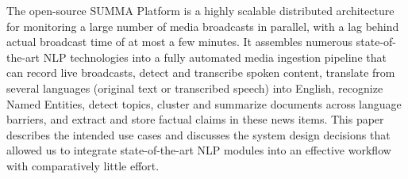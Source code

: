 The open-source SUMMA Platform is a highly scalable distributed architecture for monitoring a large number of media broadcasts in parallel, with a lag behind actual broadcast time of at most a few minutes. It assembles numerous state-of-the-art NLP technologies into a fully automated media ingestion pipeline that can record live broadcasts, detect and transcribe spoken content, translate from several languages (original text or transcribed speech) into English, recognize Named Entities, detect topics, cluster and summarize documents across language barriers, and extract and store factual claims in these news items. This paper describes the intended use cases and discusses the system design decisions that allowed us to integrate state-of-the-art NLP modules into an effective workflow with comparatively little effort.
